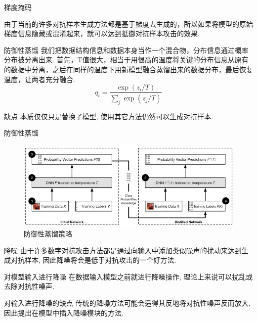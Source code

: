 \documentclass[UTF8, aspectratio=169, 10pt, t]{ctexbeamer}
\begin{document}
\begin{frame}{梯度掩码}

	由于当前的许多对抗样本生成方法都是基于梯度去生成的，所以如果将模型的原始梯度信息隐藏或混淆起来，就可以达到抵御对抗样本攻击的效果. 
	\begin{block}{防御性蒸馏}
		我们把数据结构信息和数据本身当作一个混合物，分布信息通过概率分布被分离出来. 首先，T值很大，相当于用很高的温度将关键的分布信息从原有的数据中分离，之后在同样的温度下用新模型融合蒸馏出来的数据分布，最后恢复温度，让两者充分融合. 
		\[q_i =
		\frac{\exp(z_i/T )}
		{\sum_{j}\exp(z_j/T )}\]
	\end{block}
	
	\begin{alertblock}{缺点}
		本质仅仅只是替换了模型, 使用其它方法仍然可以生成对抗样本.
	\end{alertblock}
	
\end{frame}

\begin{frame}{防御性蒸馏}
	\begin{figure}
		\centering
		\includegraphics[width=0.9\linewidth]{distill}
		\caption{防御性蒸馏策略}
		\label{fig:distill}
	\end{figure}
	
\end{frame}

\begin{frame}{降噪}
	由于许多数字对抗攻击方法都是通过向输入中添加类似噪声的扰动来达到生成对抗样本, 因此降噪将会是低于对抗攻击的一个好方法. 
	\begin{block}{对模型输入进行降噪}
		在数据输入模型之前就进行降噪操作, 理论上来说可以扰乱或去除对抗性噪声.
	\end{block}
	\begin{alertblock}{对输入进行降噪的缺点}
		传统的降噪方法可能会适得其反地将对抗性噪声反而放大, 因此提出\alert{在模型中}插入降噪模块的方法.
	\end{alertblock}
	
\end{frame}
\end{document}
